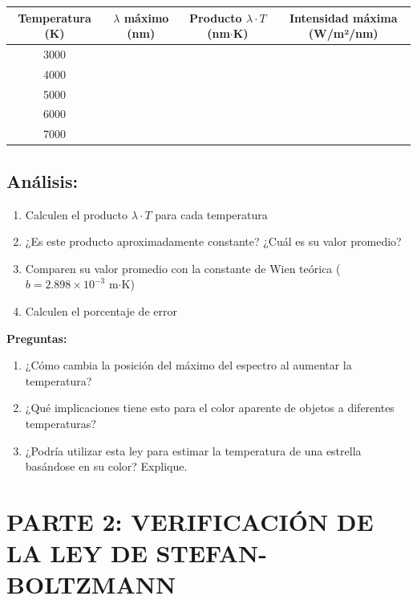 \documentclass[12pt,a4paper]{article}
\begin{document}
	\begin{center}
		\begin{tabular}{|c|c|c|c|}
			\hline
			\textbf{Temperatura (K)} & \textbf{$\lambda$ máximo (nm)} & \textbf{Producto $\lambda \cdot T$ (nm$\cdot$K)} & \textbf{Intensidad máxima (W/m²/nm)} \\
			\hline
			3000 & & & \\
			\hline
			4000 & & & \\
			\hline
			5000 & & & \\
			\hline
			6000 & & & \\
			\hline
			7000 & & & \\
			\hline
		\end{tabular}
	\end{center}
	
	\subsection{Análisis:}
	\begin{enumerate}
		\item Calculen el producto $\lambda \cdot T$ para cada temperatura
		\item ¿Es este producto aproximadamente constante? ¿Cuál es su valor promedio?
		\item Comparen su valor promedio con la constante de Wien teórica ($b = 2.898 \times 10^{-3}$ m$\cdot$K)
		\item Calculen el porcentaje de error
	\end{enumerate}
	
	\begin{preguntabox}
		\textbf{Preguntas:}
		\begin{enumerate}
			\item ¿Cómo cambia la posición del máximo del espectro al aumentar la temperatura?
			\item ¿Qué implicaciones tiene esto para el color aparente de objetos a diferentes temperaturas?
			\item ¿Podría utilizar esta ley para estimar la temperatura de una estrella basándose en su color? Explique.
		\end{enumerate}
	\end{preguntabox}
	
	\section{PARTE 2: VERIFICACIÓN DE LA LEY DE STEFAN-BOLTZMANN}
	
\end{document}
